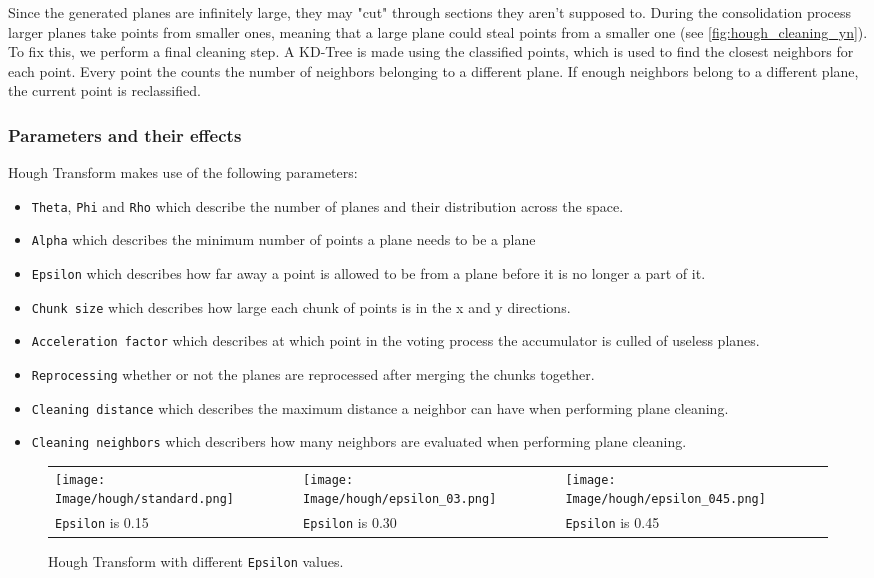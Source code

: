 \documentclass[a4paper,9pt]{article}
\begin{document}
Since the generated planes are infinitely large, they may "cut" through sections they aren't supposed to. During the consolidation process larger planes take points from smaller ones, meaning that a large plane could steal points from a smaller one (see \ref{fig:hough_cleaning_yn}). To fix this, we perform a final cleaning step. A KD-Tree is made using the classified points, which is used to find the closest neighbors for each point. Every point the counts the number of neighbors belonging to a different plane. If enough neighbors belong to a different plane, the current point is reclassified.

\subsubsection{Parameters and their effects}

Hough Transform makes use of the following parameters:
\begin{itemize}
    \item \verb|Theta|, \verb|Phi| and \verb|Rho| which describe the number of planes and their distribution across the space.
    \item \verb|Alpha| which describes the minimum number of points a plane needs to be a plane
    \item \verb|Epsilon| which describes how far away a point is allowed to be from a plane before it is no longer a part of it.
    \item \verb|Chunk size| which describes how large each chunk of points is in the x and y directions.
    \item \verb|Acceleration factor| which describes at which point in the voting process the accumulator is culled of useless planes.
    \item \verb|Reprocessing| whether or not the planes are reprocessed after merging the chunks together.
    \item \verb|Cleaning distance| which describes the maximum distance a neighbor can have when performing plane cleaning.
    \item \verb|Cleaning neighbors| which describers how many neighbors are evaluated when performing plane cleaning.
\end{itemize}

\begin{figure}[H]
    \begin{tabularx}{\textwidth}{XXX}
        \texttt{[image: Image/hough/standard.png]} & 
        \texttt{[image: Image/hough/epsilon\_03.png]} & 
        \texttt{[image: Image/hough/epsilon\_045.png]} \\
        \verb|Epsilon| is 0.15 & \verb|Epsilon| is 0.30 & \verb|Epsilon| is 0.45
    \end{tabularx}
    \caption{Hough Transform with different \texttt{Epsilon} values.}
    \label{fig:hough_epsilon}
\end{figure}
\end{document}
